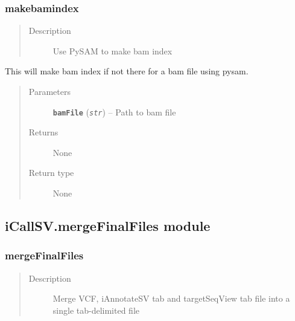 \documentclass[letterpaper,10pt,english]{sphinxmanual}
\begin{document}
\subsubsection{makebamindex}
\label{iCallSV:makebamindex}\begin{quote}\begin{description}
\item[{Description}] \leavevmode
Use PySAM to make bam index

\end{description}\end{quote}

\begin{fulllineitems}
\label{iCallSV:iCallSV.makebamindex.MakeIndex}
This will make bam index if not there for a bam file using pysam.
\begin{quote}\begin{description}
\item[{Parameters}] \leavevmode
\textbf{\texttt{bamFile}} (\emph{\texttt{str}}) -- Path to bam file

\item[{Returns}] \leavevmode
None

\item[{Return type}] \leavevmode
None

\end{description}\end{quote}

\end{fulllineitems}



\subsection{iCallSV.mergeFinalFiles module}
\label{iCallSV:module-iCallSV.mergeFinalFiles}\label{iCallSV:icallsv-mergefinalfiles-module}

\subsubsection{mergeFinalFiles}
\label{iCallSV:mergefinalfiles}\begin{quote}\begin{description}
\item[{Description}] \leavevmode
Merge VCF, iAnnotateSV tab and targetSeqView tab file into a single tab-delimited file

\end{description}\end{quote}
\end{document}

